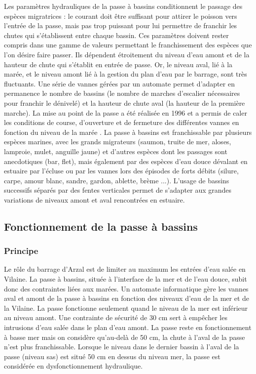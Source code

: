 \documentclass[11pt,twocolumn,titlepage,twoside]{article}\usepackage[]{graphicx}\usepackage[]{xcolor}
\begin{document}
Les paramètres hydrauliques de la passe à bassins conditionnent le passage des
espèces migratrices : le courant doit être suffisant pour attirer le poisson vers l’entrée de la passe, mais pas trop puissant pour lui permettre de franchir les chutes
qui s’établissent entre chaque bassin. Ces paramètres doivent rester compris dans une gamme de valeurs permettant
le franchissement des espèces que l’on désire faire passer. Ils dépendent étroitement du niveau d’eau amont et de
la hauteur de chute qui s’établit en entrée de passe. Or, le niveau aval, lié à
la marée, et le niveau amont lié à la gestion du plan d’eau par le barrage, sont très fluctuants. Une série de vannes gérées par un automate permet d’adapter en permanence
le nombre de bassins (le nombre de marches d’escalier nécessaires pour franchir le dénivelé) et la hauteur de chute aval
(la hauteur de la première marche). La mise au point de la passe a été réalisée en 1996 et a permis de caler les
conditions de course, d’ouverture et de fermeture des différentes vannes en
fonction du niveau de la marée \citep{briand_suivi_1998}.
La passe à bassins est franchissable par plusieurs espèces marines, avec les grands migrateurs
(saumon, truite de mer, aloses, lamproie, mulet, anguille jaune) et d’autres
espèces dont les passages sont anecdotiques (bar, flet), mais également par des espèces d’eau douce dévalant en estuaire par l’écluse
ou par les vannes lors des épisodes de forts débits (silure, carpe, amour
blanc, sandre, gardon, ablette, brème ...).
L'usage de bassins successifs séparés par des fentes verticales permet de
s’adapter aux grandes variations de niveaux amont et aval rencontrées en estuaire.


\subsection{Fonctionnement de la passe à bassins}
\subsubsection{Principe}
Le rôle du barrage d’Arzal est de limiter au maximum les entrées d’eau salée en Vilaine. La passe à bassins,
située à l’interface de la mer et de l’eau douce, subit donc des contraintes liées aux marées.
Un automate informatique gère les vannes aval et amont de la passe à bassins en fonction des niveaux d’eau de la mer
et de la Vilaine. La passe fonctionne seulement quand le niveau de la mer est inférieur au niveau amont.
Une contrainte de sécurité de 30 cm sert à empêcher les intrusions d’eau salée
dans le plan d’eau amont.
La passe reste en fonctionnement à basse mer mais on considère qu’au-delà de 50
cm, la chute à l’aval de la passe n’est plus franchissable. Lorsque le niveau
dans le dernier bassin à l’aval de la passe (niveau sas) est situé 50 cm en
dessus du niveau mer, la passe est considérée en dysfonctionnement hydraulique.
\end{document}
